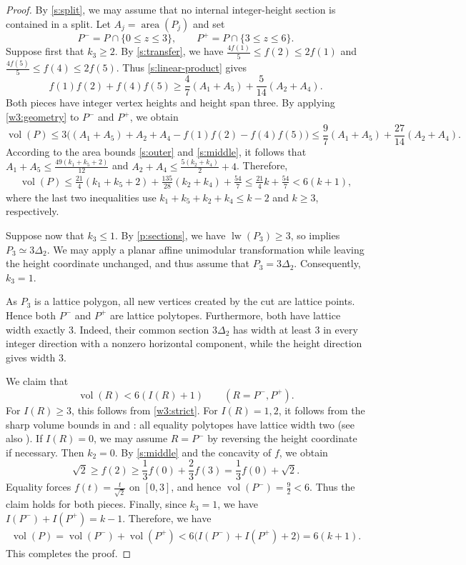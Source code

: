 \documentclass[reqno, 11pt]{article}
\numberwithin{equation}{section}
\theoremstyle{definition}
\DeclareMathOperator{\vol}{vol}
\DeclareMathOperator{\area}{area}
\DeclareMathOperator{\lw}{lw}
\numberwithin{equation}{section}
\begin{document}
\begin{proof}
By \eqref{s:split}, we may assume that no internal
integer-height section is contained in a split.
Let $A_j=\area(P_j)$ and set
\[
P^-=P\cap\{0\le z\le3\},\qquad
P^+=P\cap\{3\le z\le6\}.
\]
Suppose first that $k_3\ge2$.
By \eqref{s:transfer}, we have $\frac{4f(1)}{5}\le f(2)\le2f(1)$ and $\frac{4f(5)}{5}\le f(4)\le2f(5)$. Thus \eqref{s:linear-product} gives
\[
f(1)f(2)+f(4)f(5)\ge\frac47(A_1+A_5)+\frac5{14}(A_2+A_4).
\]
Both pieces have integer vertex heights and height span three. By applying \cref{w3:geometry} to $P^-$ and $P^+$,
we obtain
\[
\vol(P)\le
3\bigl((A_1+A_5)+A_2+A_4-f(1)f(2)-f(4)f(5)\bigr)\le\frac97(A_1+A_5)+\frac{27}{14}(A_2+A_4).
\]
According to the area bounds \eqref{s:outer} and \eqref{s:middle}, it follows that $A_1+A_5\le\frac{49(k_1+k_5+2)}{12}$ and $A_2+A_4\le\frac{5(k_2+k_4)}{2}+4$.
Therefore,
\begin{align*}
\vol(P)\le\frac{21}{4}(k_1+k_5+2)+\frac{135}{28}(k_2+k_4)
+\frac{54}{7}\le\frac{21}{4}k+\frac{54}{7}<6(k+1),
\end{align*}
where the last two inequalities use $k_1+k_5+k_2+k_4\le k-2$
and $k\ge3$, respectively.

Suppose now that $k_3\le1$. By \cref{p:sections}, we have $\lw(P_3)\ge3$, so \cite[Theorem~1.1]{ACFH2026} implies $P_3\simeq3\Delta_2$. We may apply a planar affine unimodular transformation while leaving the height coordinate unchanged, and thus assume that $P_3=3\Delta_2$. Consequently, $k_3=1$.

As $P_3$ is a lattice polygon, all new vertices created by the cut are lattice points. Hence both $P^-$ and $P^+$ are lattice polytopes. Furthermore, both have lattice width exactly $3$. Indeed, their common section $3\Delta_2$ has width at least $3$ in every integer direction with a nonzero horizontal component, while the height direction gives width $3$.

We claim that
\[
\vol(R)<6(I(R)+1)
\qquad(R=P^-,P^+).
\]
For $I(R)\ge3$, this follows from
\cref{w3:strict}. For $I(R)=1,2$, it follows
from the sharp volume bounds in \cite{Kas10} and
\cite[Corollary~5.2]{BK2016}: all equality polytopes have lattice
width two (see also \cite[Section~1.1]{BK2016}).
If $I(R)=0$, we may assume $R=P^-$ by reversing the height coordinate if necessary. Then $k_2=0$. By \eqref{s:middle} and the concavity of $f$, we obtain
\[
\sqrt2\ge f(2)\ge\frac13f(0)+\frac23f(3)=\frac13f(0)+\sqrt2.
\]
Equality forces $f(t)=\frac{t}{\sqrt2}$ on $[0,3]$,
and hence $\vol(P^-)=\frac{9}{2}<6$.
Thus the claim holds for both pieces.
Finally, since $k_3=1$, we have
$I(P^-)+I(P^+)=k-1$. Therefore, we have 
\begin{align*}
\vol(P)=\vol(P^-)+\vol(P^+)<6\bigl(I(P^-)+I(P^+)+2\bigr)=6(k+1).
\end{align*}
This completes the proof.
\end{proof}
\end{document}
